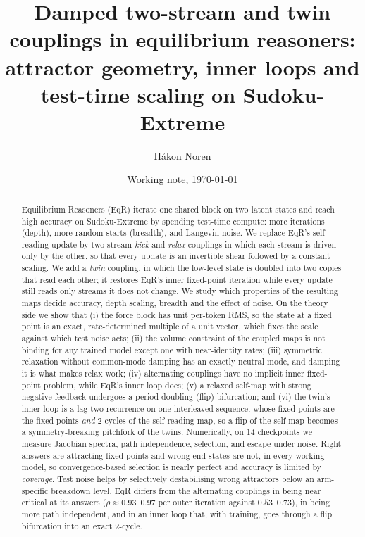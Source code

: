 \documentclass[11pt]{article}
\title{Damped two-stream and twin couplings in equilibrium reasoners:\\
attractor geometry, inner loops and test-time scaling on Sudoku-Extreme}
\author{H\aa kon Noren}
\date{Working note, \today}
\theoremstyle{definition}
\begin{document}
\maketitle

\begin{abstract}
Equilibrium Reasoners (EqR) iterate one shared block on two latent states and reach high accuracy on
Sudoku-Extreme by spending test-time compute: more iterations (depth), more random starts (breadth), and
Langevin noise. We replace EqR's self-reading update by two-stream \emph{kick} and \emph{relax} couplings in which
each stream is driven only by the other, so that every update is an invertible shear followed by a constant
scaling. We add a \emph{twin} coupling, in which the low-level state is doubled into two copies that read each other;
it restores EqR's inner fixed-point iteration while every update still reads only streams it does not change.
We study which properties of the resulting maps decide accuracy, depth scaling, breadth and the effect of noise.
On the theory side we show that (i) the force block has unit per-token RMS, so the state at a fixed point is
an exact, rate-determined multiple of a unit vector, which fixes the scale against which test noise acts;
(ii) the volume constraint of the coupled maps is not binding for any trained model except one with near-identity rates;
(iii) symmetric relaxation without common-mode damping has an exactly neutral mode, and damping it is what makes relax work;
(iv) alternating couplings have no implicit inner fixed-point problem, while EqR's inner loop does;
(v) a relaxed self-map with strong negative feedback undergoes a period-doubling (flip) bifurcation; and
(vi) the twin's inner loop is a lag-two recurrence on one interleaved sequence, whose fixed points are the fixed points
\emph{and} 2-cycles of the self-reading map, so a flip of the self-map becomes a symmetry-breaking pitchfork of the twins.
Numerically, on 14 checkpoints we measure Jacobian spectra, path independence, selection, and escape under noise.
Right answers are attracting fixed points and wrong end states are not, in every working model, so convergence-based
selection is nearly perfect and accuracy is limited by \emph{coverage}. Test noise helps by selectively
destabilising wrong attractors below an arm-specific breakdown level. EqR differs from the alternating couplings in being near
critical at its answers ($\rho\approx 0.93$--$0.97$ per outer iteration against $0.53$--$0.73$), in being more path
independent, and in an inner loop that, with training, goes through a flip bifurcation into an exact 2-cycle.

\end{abstract}
\end{document}
